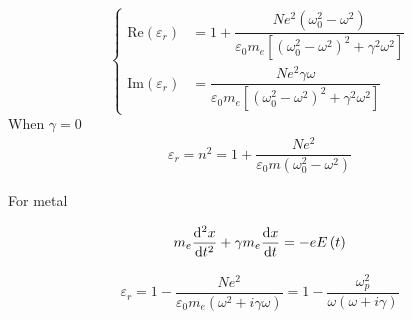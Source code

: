 \begin{equation*}
  \left\{
  \begin{aligned}
    \mathrm{Re} \left( \varepsilon_{r} \right) &= 1 + \dfrac{N e^2 \left( \omega_0^2 - \omega^2 \right)}{\varepsilon_0 m_e \left[ \left( \omega_0^2 - \omega^2 \right)^2 + \gamma^2 \omega^2 \right]}  \\
    \mathrm{Im} \left( \varepsilon_{r} \right) &= \dfrac{N e^2 \gamma \omega}{\varepsilon_0 m_e \left[ \left( \omega_0^2 - \omega^2 \right)^2 + \gamma^2 \omega^2 \right]}  
  \end{aligned}
  \right.
\end{equation*}
When $\gamma = 0$
\begin{equation*}
  \begin{aligned}
    \varepsilon_r = n^2 = 1 + \dfrac{N e^2}{\varepsilon_0 m \left( \omega_0^2 - \omega^2 \right)} 
  \end{aligned}
\end{equation*}

For metal

\begin{equation*}
  \begin{aligned}
    m_e \dfrac{\mathop{}\!\mathrm{d} ^2 x}{\mathop{}\!\mathrm{d} t^2} + \gamma m_e \dfrac{\mathop{}\!\mathrm{d} x}{\mathop{}\!\mathrm{d} t} = - e E \left( t \right)
  \end{aligned}
\end{equation*}

\begin{equation*}
  \begin{aligned}
    \varepsilon_r = 1 - \dfrac{N e^2}{\varepsilon_0 m_e \left(\omega^2 + i \gamma \omega \right)} = 1 - \dfrac{\omega_p^2}{\omega \left( \omega + i \gamma \right)}  
  \end{aligned}
\end{equation*}








